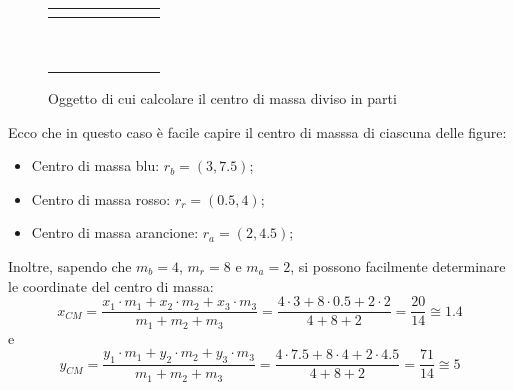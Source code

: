 \documentclass[a4paper]{extarticle}
\begin{document}
\begin{figure}[H]
  \centering
  \begin{tabular}{|c|c|c|c|c|c|c|}
    \hline
    $ $ & $ $ & $ $ & $ $ & $ $ & $ $ & $ $\\
    \hline
    $ $ & \cellcolor{red!25}$ $ & \cellcolor{blue!25}$ $ & \cellcolor{blue!25}$ $ & \cellcolor{blue!25}$ $ & \cellcolor{blue!25}$ $ & $ $\\
    \hline
    $ $ & \cellcolor{red!25}$ $ & $ $ & $ $ & $ $ & $ $ & $ $\\
    \hline
    $ $ & \cellcolor{red!25}$ $ & $ $ & $ $ & $ $ & $ $ & $ $\\
    \hline
    $ $ & \cellcolor{red!25}$ $ & \cellcolor{orange!25}$ $ & \cellcolor{orange!25}$ $ & $ $ & $ $ & $ $\\
    \hline
    $ $ & \cellcolor{red!25}$ $ & $ $ & $ $ & $ $ & $ $ & $ $\\
    \hline
    $ $ & \cellcolor{red!25}$ $ & $ $ & $ $ & $ $ & $ $ & $ $\\
    \hline
    $ $ & \cellcolor{red!25}$ $ & $ $ & $ $ & $ $ & $ $ & $ $\\
    \hline
    $ $ & \cellcolor{red!25}$ $ & $ $ & $ $ & $ $ & $ $ & $ $\\
    \hline
    $ $ & $ $ & $ $ & $ $ & $ $ & $ $ & $ $\\
    \hline
  \end{tabular}
  \caption{Oggetto di cui calcolare il centro di massa diviso in parti}
  \label{fig:calcolo_centro_massa_figura_divisa_parti}
\end{figure}

\vspace{1em}
\noindent
Ecco che in questo caso è facile capire il centro di masssa di ciascuna delle figure:
\begin{itemize}
  \item Centro di massa \textcolor{blue!25}{blu}: $r_b=(3,7.5)$;
  \item Centro di massa \textcolor{red!25}{rosso}: $r_r=(0.5,4)$;
  \item Centro di massa \textcolor{orange!25}{arancione}: $r_a=(2,4.5)$;
\end{itemize}
Inoltre, sapendo che $m_b=4$, $m_r=8$ e $m_a=2$, si possono facilmente determinare le coordinate del centro di massa:
\[x_{CM}=\frac{x_1 \cdot m_1 + x_2 \cdot m_2 + x_3 \cdot m_3}{m_1+m_2+m_3} = \frac{4 \cdot 3 + 8 \cdot 0.5 + 2 \cdot 2}{4+8+2}=\frac{20}{14}\cong 1.4\]
e
\[y_{CM}=\frac{y_1 \cdot m_1 + y_2 \cdot m_2 + y_3 \cdot m_3}{m_1+m_2+m_3} = \frac{4 \cdot 7.5 + 8 \cdot 4 + 2 \cdot 4.5}{4+8+2}=\frac{71}{14}\cong 5\]
\end{document}
